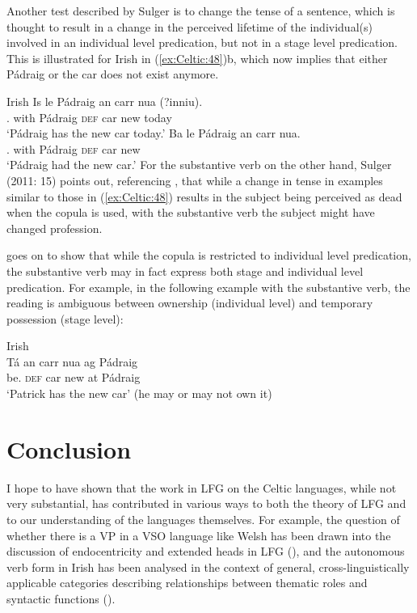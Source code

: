 \documentclass[output=paper,colorlinks,citecolor=brown]{langscibook}
\begin{document}
Another test described by Sulger is to change the tense of a sentence, which is thought to result in a change in the perceived lifetime of the individual(s) involved in an individual level predication, but not in a stage level predication. This is illustrated for Irish in (\ref{ex:Celtic:48})b, which now implies that either Pádraig or the car does not exist anymore.

\ea\label{ex:Celtic:48} Irish \citep[12, 14]{Sulger2011}
\ea
\gll Is le Pádraig an carr nua (?inniu).\\
{\COP.\PRS} with Pádraig \textsc{def} car new  today\\
\glt`Pádraig has the new car today.'
\ex
\gll Ba  le Pádraig an carr nua.\\
{\COP.\PST} with Pádraig \textsc{def} car new\\
\glt`Pádraig had the new car.'
\z\z
For the substantive verb on the other hand, Sulger (2011: 15) points out, referencing \citet{Doherty1996}, that while a change in tense in examples similar to those in (\ref{ex:Celtic:48}) results in the subject being perceived as dead when the copula is used, with the substantive verb the subject might have changed profession.

\citet[12--14]{Sulger2011} goes on to show that while the copula is restricted to individual level predication, the substantive verb may in fact express both stage and individual level predication. For example, in the following example with the substantive verb, the reading is ambiguous between ownership (individual level) and temporary possession (stage level):

\ea\label{ex:Celtic:49} Irish \citep[12]{Sulger2011}\\
\gll Tá an carr nua ag Pádraig\\
{be.\PRS} \textsc{def} car new at Pádraig\\
\glt`Patrick has the new car' (he may or may not own it)
\z

\section{Conclusion}
\label{sec:Celtic:6}

I hope to have shown that the work in LFG on the Celtic languages, while not very substantial, has contributed in various ways to both the theory of LFG and to our understanding of the languages themselves. For example, the question of whether there is a VP in a VSO language like Welsh has been drawn into the discussion of endocentricity and extended heads in LFG (), and the autonomous verb form in Irish has been analysed in the context of general, cross-linguistically applicable categories describing relationships between thematic roles and syntactic functions ().
\end{document}
